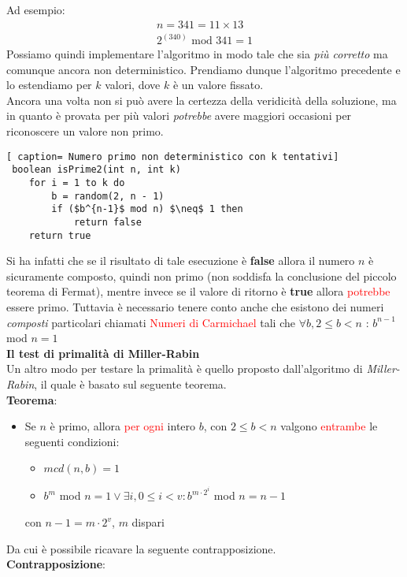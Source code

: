 \documentclass[../cheatSheetAlgoritmi.tex]{subfiles}
\begin{document}
Ad esempio:
\begin{align*} 
	 n = 341 = 11 \times 13 \\
    2^{(340)} \text{ mod } 341 = 1
\end{align*}
Possiamo quindi implementare l'algoritmo in modo tale che sia \emph{più corretto} ma comunque ancora non deterministico. Prendiamo dunque l'algoritmo precedente e lo estendiamo per $k$ valori, dove $k$ è un valore fissato. \\
Ancora una volta non si può avere la certezza della veridicità della soluzione, ma in quanto è provata per più valori \emph{potrebbe} avere maggiori occasioni per riconoscere un valore non primo.
 \begin{lstlisting}[ caption= Numero primo non deterministico con k tentativi]
 boolean isPrime2(int n, int k)
 	for i = 1 to k do
 		b = random(2, n - 1)
 		if ($b^{n-1}$ mod n) $\neq$ 1 then
 			return false
 	return true
\end{lstlisting}
Si ha infatti che se il risultato di tale esecuzione è \textbf{false} allora il numero $n$ è sicuramente composto, quindi non primo (non soddisfa la conclusione del piccolo teorema di Fermat), mentre invece se il valore di ritorno è \textbf{true} allora \textcolor{red}{potrebbe} essere primo. Tuttavia è necessario tenere conto anche che esistono dei numeri \emph{composti} particolari chiamati \textcolor{red}{Numeri di Carmichael} tali che $\forall b, 2 \leq b < n$ : $b^{n-1}$ mod $n = 1$  \\
\textbf{Il test di primalità di Miller-Rabin} \\
Un altro modo per testare la primalità è quello proposto dall'algoritmo di \emph{Miller-Rabin}, il quale è basato sul seguente teorema. \\
\textbf{Teorema}:
\begin{itemize}
	\item Se $n$ è primo, allora \textcolor{red}{per ogni} intero $b$, con $2 \leq b < n$ valgono \textcolor{red}{entrambe} le seguenti condizioni:
	\begin{itemize}
		\item $mcd(n, b) = 1$
		\item $b^m$ mod $n= 1 \lor \exists i, 0 \leq i < v : b^{m \cdot 2^i}$ mod $n = n - 1$
	\end{itemize}
	con $n - 1 = m \cdot 2^{v}$, $m$ dispari
\end{itemize}
Da cui è possibile ricavare la seguente contrapposizione. \\
\textbf{Contrapposizione}: \\
\end{document}
